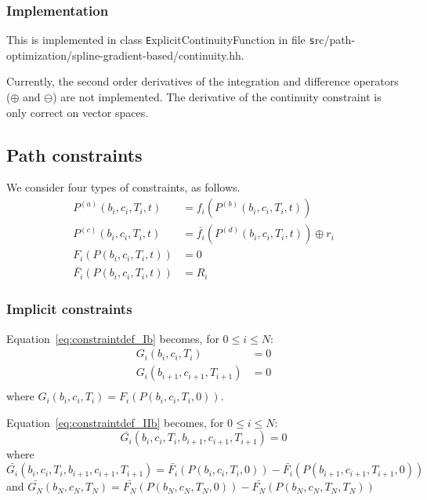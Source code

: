 \documentclass {article}
\newcommand\spline[4]{P(#1, #2, #3, #4)}
\newcommand\splinea[2]{\spline{b_{#1}}{c_{#1}}{T_{#1}}{#2}}
\newcommand\subspline[5]{P^{#1}(#2, #3, #4, #5)}
\newcommand\subsplinea[3]{\subspline{#1}{b_{#2}}{c_{#2}}{T_{#2}}{#3}}
\begin{document}
\subsubsection{Implementation}
This is implemented in class {\texttt ExplicitContinuityFunction}
in file {\texttt src/path-optimization/spline-gradient-based/continuity.hh}.

Currently, the second order derivatives of the integration and difference operators
($\oplus$ and $\ominus$) are not implemented. The derivative of the continuity constraint is
only correct on vector spaces.

\subsection{Path constraints}

We consider four types of constraints, as follows.
\begin{align}
     \subsplinea{(a)}{i}{t} &= f_i (\subsplinea{(b)}{i}{t}) \label{eq:constraintdef_Ia}
  \\ \subsplinea{(c)}{i}{t} &= \bar{f_i} (\subsplinea{(d)}{i}{t}) \oplus r_i \label{eq:constraintdef_IIa}
  \\      F_i  (\splinea{i}{t}) &= 0   \label{eq:constraintdef_Ib}
  \\ \bar{F_i} (\splinea{i}{t}) &= R_i \label{eq:constraintdef_IIb}
\end{align}

\subsubsection{Implicit constraints}
Equation~\eqref{eq:constraintdef_Ib} becomes, for $0\le i\le N$:
\begin{align*}
  G_i(b_i, c_i, T_i) &= 0 \\
  G_i(b_{i+1}, c_{i+1}, T_{i+1}) &= 0 \\
\end{align*}
where $G_i(b_i, c_i, T_i) = F_i  (\splinea{i}{0})$.

Equation~\eqref{eq:constraintdef_IIb} becomes, for $0\le i\le N$:
\begin{equation*}
  \bar{G_i}(b_i, c_i, T_i, b_{i+1}, c_{i+1}, T_{i+1}) = 0
\end{equation*}
where $
\bar{G_i}(b_i, c_i, T_i, b_{i+1}, c_{i+1}, T_{i+1}) =
\bar{F_i} (\splinea{i}{0}) - \bar{F_i} (\splinea{i+1}{0})
$
and
$
\bar{G_N}(b_N, c_N, T_N) =
\bar{F_N} (\splinea{N}{0}) - \bar{F_N} (\splinea{N}{T_N})
$
\end{document}
